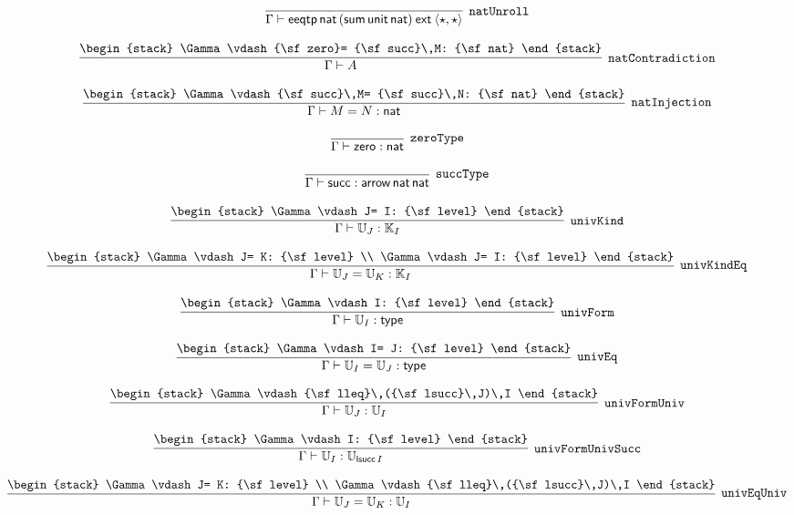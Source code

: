 \[
\infer[{\tt natUnroll}]{\Gamma \vdash {\sf eeqtp}\,{\sf nat}\,({\sf sum}\,{\sf unit}\,{\sf nat})\:{\sf ext}\:\langle \star ,\star \rangle }{}
\]

\[
\infer[{\tt natContradiction}]{\Gamma \vdash A}{
\begin{stack}
\Gamma \vdash {\sf zero}= {\sf succ}\,M: {\sf nat}
\end{stack}}
\]

\[
\infer[{\tt natInjection}]{\Gamma \vdash M= N: {\sf nat}}{
\begin{stack}
\Gamma \vdash {\sf succ}\,M= {\sf succ}\,N: {\sf nat}
\end{stack}}
\]

\[
\infer[{\tt zeroType}]{\Gamma \vdash {\sf zero}: {\sf nat}}{}
\]

\[
\infer[{\tt succType}]{\Gamma \vdash {\sf succ}: {\sf arrow}\,{\sf nat}\,{\sf nat}}{}
\]

\[
\infer[{\tt univKind}]{\Gamma \vdash {\Bbb U}_{J}: {\Bbb K}_{I}}{
\begin{stack}
\Gamma \vdash J= I: {\sf level}
\end{stack}}
\]

\[
\infer[{\tt univKindEq}]{\Gamma \vdash {\Bbb U}_{J}= {\Bbb U}_{K}: {\Bbb K}_{I}}{
\begin{stack}
\Gamma \vdash J= K: {\sf level}
\\
\Gamma \vdash J= I: {\sf level}
\end{stack}}
\]

\[
\infer[{\tt univForm}]{\Gamma \vdash {\Bbb U}_{I}: {\sf type}}{
\begin{stack}
\Gamma \vdash I: {\sf level}
\end{stack}}
\]

\[
\infer[{\tt univEq}]{\Gamma \vdash {\Bbb U}_{I}= {\Bbb U}_{J}: {\sf type}}{
\begin{stack}
\Gamma \vdash I= J: {\sf level}
\end{stack}}
\]

\[
\infer[{\tt univFormUniv}]{\Gamma \vdash {\Bbb U}_{J}: {\Bbb U}_{I}}{
\begin{stack}
\Gamma \vdash {\sf lleq}\,({\sf lsucc}\,J)\,I
\end{stack}}
\]

\[
\infer[{\tt univFormUnivSucc}]{\Gamma \vdash {\Bbb U}_{I}: {\Bbb U}_{{\sf lsucc}\,I}}{
\begin{stack}
\Gamma \vdash I: {\sf level}
\end{stack}}
\]

\[
\infer[{\tt univEqUniv}]{\Gamma \vdash {\Bbb U}_{J}= {\Bbb U}_{K}: {\Bbb U}_{I}}{
\begin{stack}
\Gamma \vdash J= K: {\sf level}
\\
\Gamma \vdash {\sf lleq}\,({\sf lsucc}\,J)\,I
\end{stack}}
\]

